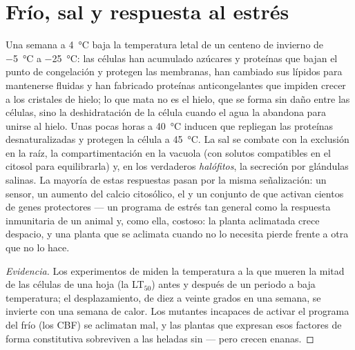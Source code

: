 \section{Frío, sal y respuesta al estrés}

\begin{proposition}\label{prop:b2:plant-plasticity:stress}
Una semana a \qty{4}{\celsius} baja la temperatura letal de un centeno de
invierno de \qty{-5}{\celsius} a \qty{-25}{\celsius}: las células han
acumulado azúcares y proteínas que bajan el punto de congelación y
protegen las membranas, han cambiado sus lípidos para mantenerse fluidas
y han fabricado proteínas anticongelantes que impiden crecer a los
cristales de hielo; lo que mata no es el hielo, que se forma sin daño
entre las células, sino la deshidratación de la célula cuando el agua la
abandona para unirse al hielo. Unas pocas horas a \qty{40}{\celsius}
inducen \emph{} que repliegan las proteínas
desnaturalizadas y protegen la célula a \qty{45}{\celsius}. La sal se
combate con la exclusión en la raíz, la compartimentación en la vacuola
(con solutos compatibles en el citosol para equilibrarla) y, en los
verdaderos \emph{halófitos}, la secreción por glándulas salinas. La
mayoría de estas respuestas pasan por la misma señalización: un sensor,
un aumento del calcio citosólico, el  y un conjunto de
 que activan cientos de genes protectores --- un
programa de estrés tan general como la respuesta inmunitaria de un animal
y, como ella, costoso: la planta aclimatada crece despacio, y una planta
que se aclimata cuando no lo necesita pierde frente a otra que no lo hace.
\end{proposition}
\begin{proof}[Evidencia]
Los experimentos de  miden la temperatura a la que
mueren la mitad de las células de una hoja (la LT$_{50}$) antes y después
de un periodo a baja temperatura; el desplazamiento, de diez a veinte
grados en una semana, se invierte con una semana de calor. Los mutantes
incapaces de activar el programa del frío (los 
CBF) se aclimatan mal, y las plantas que expresan esos factores de forma
constitutiva sobreviven a las heladas sin  --- pero crecen
enanas.
\end{proof}

